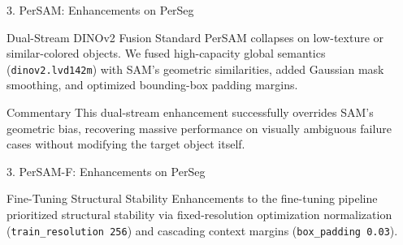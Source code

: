 \documentclass[aspectratio=169, 10pt]{beamer}
\begin{document}
\begin{frame}{3. PerSAM: Enhancements on PerSeg}
    \begin{block}{Dual-Stream DINOv2 Fusion}
        Standard PerSAM collapses on low-texture or similar-colored objects. We fused high-capacity global semantics (\texttt{dinov2.lvd142m}) with SAM's geometric similarities, added Gaussian mask smoothing, and optimized bounding-box padding margins.
    \end{block}

    \begin{table}[htbp]
    \centering
    \caption{Enhanced PerSAM vs Reproduced Baseline on PerSeg}
    \end{table}

    \begin{alertblock}{Commentary}
        \footnotesize This dual-stream enhancement successfully overrides SAM's geometric bias, recovering massive performance on visually ambiguous failure cases without modifying the target object itself.
    \end{alertblock}
\end{frame}

\begin{frame}{3. PerSAM-F: Enhancements on PerSeg}
    \begin{block}{Fine-Tuning Structural Stability}
        Enhancements to the fine-tuning pipeline prioritized structural stability via fixed-resolution optimization normalization (\texttt{train\_resolution 256}) and cascading context margins (\texttt{box\_padding 0.03}).
    \end{block}

    \begin{table}[htbp]
    \centering
    \caption{Enhanced PerSAM-F vs Reproduced Baseline on PerSeg}
    \end{table}
\end{frame}
\end{document}
